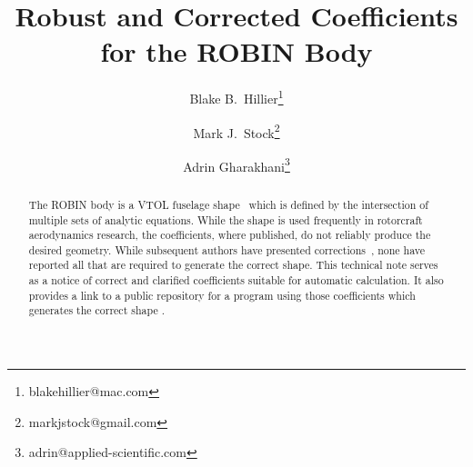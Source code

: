 \documentclass{ahs}
\begin{document}
\title{Robust and Corrected Coefficients for the ROBIN Body}

\author{Blake B.~Hillier\thanks{blakehillier@mac.com}}
\author{Mark J.~Stock\thanks{markjstock@gmail.com}}
\author{Adrin Gharakhani\thanks{adrin@applied-scientific.com}}

\maketitle

\begin{abstract}
The ROBIN body is a VTOL fuselage shape~\cite{nasa87762,mineckgorton,nasa80051,nasa1999}
which is defined by the intersection of multiple sets of analytic equations.
While the shape is used frequently in rotorcraft aerodynamics research, the coefficients,
where published, do not reliably produce the desired geometry.
While subsequent authors have presented corrections~\cite{nasa87762,mineckgorton},
none have reported all that are required to generate the correct shape.
This technical note serves as a notice of correct and clarified coefficients suitable for automatic
calculation. It also provides a link to a public repository
for a program using those coefficients which generates the correct shape \cite{robinsurfmesh}.
\end{abstract}

\begin{nomenclature}[$C_{p}$]
\end{nomenclature}
\end{document}
